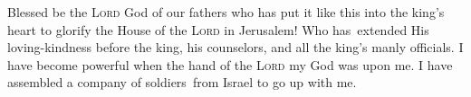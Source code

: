 \begin{inparaenum}\setcounter{enumi}{26}
   Blessed be the \textsc{Lord} God of our fathers who has put it like this into the king's heart to glorify the House of the \textsc{Lord} in Jerusalem!%
   Who has\understood\ extended His loving-kindness before the king, his counselors, and all the king's manly officials. I have become powerful when the hand of the \textsc{Lord} my God was upon me. I have assembled a company of soldiers\understood\ from Israel to go up with me.%
\end{inparaenum}
